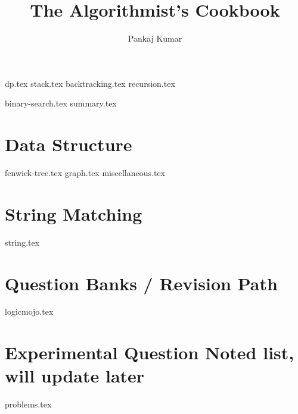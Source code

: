 \documentclass{../latex-setting/cmemoir}
\title{The Algorithmist's Cookbook}
\author{Pankaj Kumar}
\begin{document}
\maketitle

\frontmatter

\tableofcontents

\restoregeometry%

\mainmatter{}


{dp.tex}
{stack.tex}
{backtracking.tex}
{recursion.tex}

{binary-search.tex}
{summary.tex}



\part{Data Structure}
{fenwick-tree.tex}
{graph.tex}
{miscellaneous.tex}



\part{String Matching}
{string.tex}

\part{ Question Banks / Revision Path}
{logicmojo.tex}
% 
\part{Experimental Question Noted list, will update later}
{problems.tex}
\end{document}
